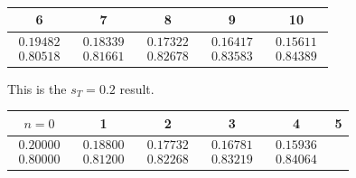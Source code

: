 \begin{exercises}
\begin{answer}
\begin{exparts}
\begin{center}
\begin{tabular}{c|ccccc}
             \end{tabular}                                     \\[1ex]
             \begin{tabular}{|ccccc}
               6  &7  &8  &9 &10 \\ 
               \hline
               $\begin{array}{c}  0.19482 \\ 0.80518 \end{array}$
               &$\begin{array}{c}  0.18339 \\ 0.81661 \end{array}$
               &$\begin{array}{c}  0.17322 \\ 0.82678 \end{array}$
               &$\begin{array}{c}  0.16417 \\ 0.83583 \end{array}$
               &$\begin{array}{c}  0.15611 \\ 0.84389 \end{array}$
             \end{tabular}
           \end{center}
         \partsitem This is the $s_T=0.2$ result.
           \begin{center}
             \begin{tabular}{c|ccccc}
               $n=0$ &1  &2  &3  &4  &5  \\ 
               \hline
               $\begin{array}{c}  0.20000 \\ 0.80000 \end{array}$
               &$\begin{array}{c}   0.18800 \\ 0.81200 \end{array}$
               &$\begin{array}{c}   0.17732 \\ 0.82268 \end{array}$
               &$\begin{array}{c}   0.16781 \\ 0.83219 \end{array}$
               &$\begin{array}{c}   0.15936 \\ 0.84064 \end{array}$

\end{tabular}
\end{center}
\end{exparts}
\end{answer}
\end{exercises}
